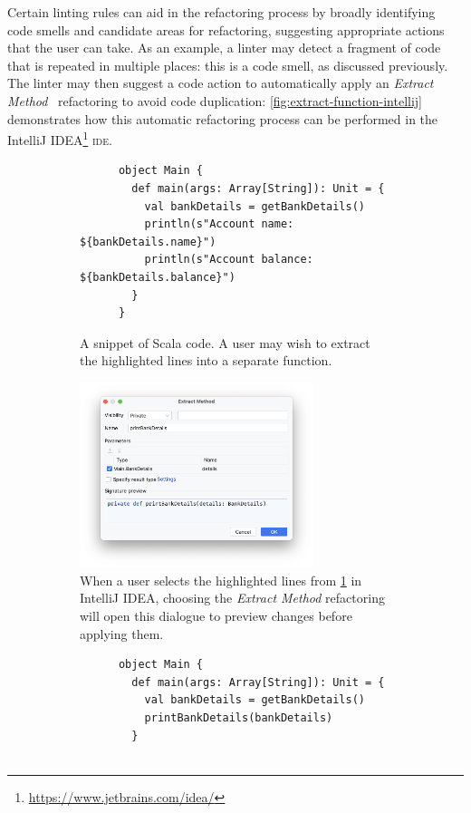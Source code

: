 \documentclass[../../main.tex]{subfiles}
\begin{document}
Certain linting rules can aid in the refactoring process by broadly identifying code smells and candidate areas for refactoring, suggesting appropriate actions that the user can take.
As an example, a linter may detect a fragment of code that is repeated in multiple places: this is a code smell, as discussed previously.
The linter may then suggest a code action to automatically apply an \emph{Extract Method}~\cite{fowler_refactoring_2018} refactoring to avoid code duplication: \cref{fig:extract-function-intellij} demonstrates how this automatic refactoring process can be performed in the IntelliJ IDEA\footnote{\url{https://www.jetbrains.com/idea/}} \textsc{ide}.

\begin{figure}[htbp]
  \centering
  \begin{subfigure}{\textwidth}
    \centering
    \begin{verbatim}
      object Main {
        def main(args: Array[String]): Unit = {
          val bankDetails = getBankDetails()
          println(s"Account name: ${bankDetails.name}")
          println(s"Account balance: ${bankDetails.balance}")
        }
      }
    \end{verbatim}
    \caption{A snippet of Scala code. A user may wish to extract the highlighted lines into a separate function.}
    \label{fig:extract-function-intellij-before}
  \end{subfigure}
  \begin{subfigure}{\textwidth}
    \centering
    \includegraphics[width=0.75\textwidth]{src/background/extract-function-intellij.png}
    \caption{When a user selects the highlighted lines from \cref{fig:extract-function-intellij-before} in IntelliJ IDEA, choosing the \emph{Extract Method} refactoring will open this dialogue to preview changes before applying them.}
    \label{fig:extract-function-intellij-dialogue}
  \end{subfigure}
  \begin{subfigure}{\textwidth}
    \vspace{3ex} %
    \centering
    \begin{verbatim}
      object Main {
        def main(args: Array[String]): Unit = {
          val bankDetails = getBankDetails()
          printBankDetails(bankDetails)
        }


\end{verbatim}
\end{subfigure}
\end{figure}
\end{document}
